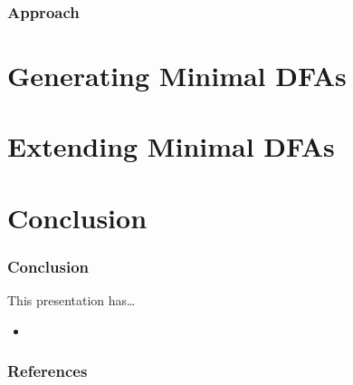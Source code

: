 \documentclass[handout,10pt]{beamer}%
\begin{document}
	\begin{frame}
		\frametitle{Approach}
		
		
	\end{frame}
	
	\section{Generating Minimal DFAs}
	
	\section{Extending Minimal DFAs}
	
	\section{Conclusion}

	\begin{frame}
		\frametitle{Conclusion}
		
		This presentation has\ldots
		\begin{itemize}
			\item 
		\end{itemize}
	
	\end{frame}

	\begin{frame}
		\frametitle{References}
		
		\tiny
		
		
	\end{frame}
\end{document}
